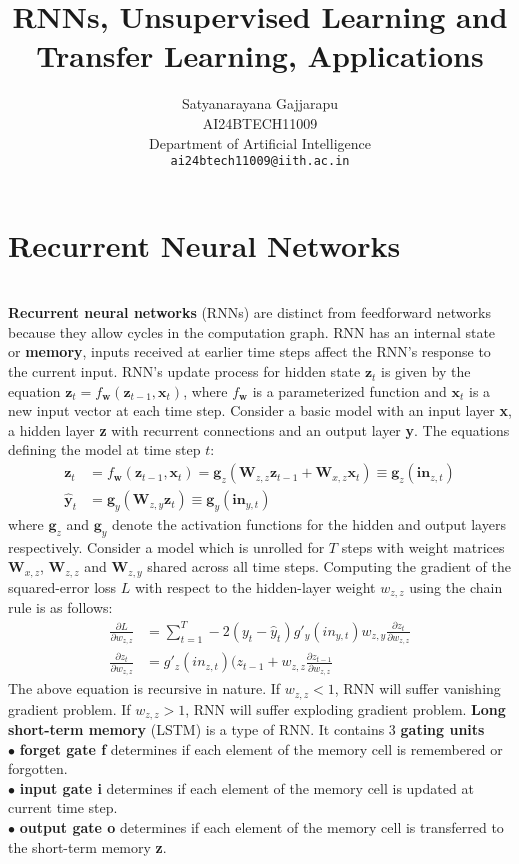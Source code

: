 \documentclass{article}
\title{RNNs, Unsupervised Learning and Transfer Learning, Applications}
\author{%
Satyanarayana Gajjarapu \\
AI24BTECH11009 \\
Department of Artificial Intelligence \\
\texttt{ai24btech11009@iith.ac.in} \\
}
\begin{document}
\maketitle
\section{Recurrent Neural Networks}
\begin{paragraph}
\\
\textbf{Recurrent neural networks} (RNNs) are distinct from feedforward networks because they allow cycles in the computation graph. RNN has an internal state or \textbf{memory}, inputs received at earlier time steps affect the RNN’s response to the current input. RNN's update process for hidden state $\textbf{z}_t$ is given by the equation $\textbf{z}_t = f_\textbf{w}(\textbf{z}_{t-1}, \textbf{x}_t)$, where $f_\textbf{w}$ is a parameterized function and $\textbf{x}_t$ is a new input vector at each time step. Consider a basic model with an input layer \textbf{x}, a hidden layer \textbf{z} with recurrent connections and an output layer \textbf{y}. The equations defining the model at time step $t$:
\begin{align*}
    \textbf{z}_t & = f_\textbf{w}(\textbf{z}_{t-1}, \textbf{x}_t) = \textbf{g}_z(\textbf{W}_{z,z}\textbf{z}_{t-1} + \textbf{W}_{x,z}\textbf{x}_t) \equiv \textbf{g}_z(\textbf{in}_{z,t}) \\
    \hat{\textbf{y}}_t & = \textbf{g}_y(\textbf{W}_{z,y}\textbf{z}_t) \equiv \textbf{g}_y(\textbf{in}_{y,t})
\end{align*}
where $\textbf{g}_z$ and $\textbf{g}_y$ denote the activation functions for the hidden and output layers respectively. Consider a model which is unrolled for $T$ steps with weight matrices $\textbf{W}_{x,z}$, $\textbf{W}_{z,z}$ and $\textbf{W}_{z,y}$ shared across all time steps. Computing the gradient of the squared-error loss $L$ with respect to the hidden-layer weight $w_{z,z}$ using the chain rule is as follows:
\begin{align*}
     \frac{\partial L}{\partial w_{z,z}} & = \sum\limits_{t=1}^{T}-2(y_t - \hat{y}_t)g'_y(in_{y,t})w_{z,y}\frac{\partial z_t}{\partial w_{z,z}} \\ 
     \frac{\partial z_t}{\partial w_{z,z}} & = g'_z(in_{z,t})(z_{t-1}+w_{z,z}\frac{\partial z_{t-1}}{\partial w_{z,z}}
\end{align*}
The above equation is recursive in nature. If $w_{z,z} < 1$, RNN will suffer vanishing gradient problem. If $w_{z,z} > 1$, RNN will suffer exploding gradient problem. \textbf{Long short-term memory} (LSTM) is a type of RNN. It contains 3 \textbf{gating units}\\
$\bullet$ \textbf{forget gate f} determines if each element of the memory cell is remembered or forgotten. \\
$\bullet$ \textbf{input gate i} determines if each element of the memory cell is updated at current time step. \\
$\bullet$ \textbf{output gate o} determines if each element of the memory cell is transferred to the short-term memory \textbf{z}.
\end{paragraph}
\end{document}
